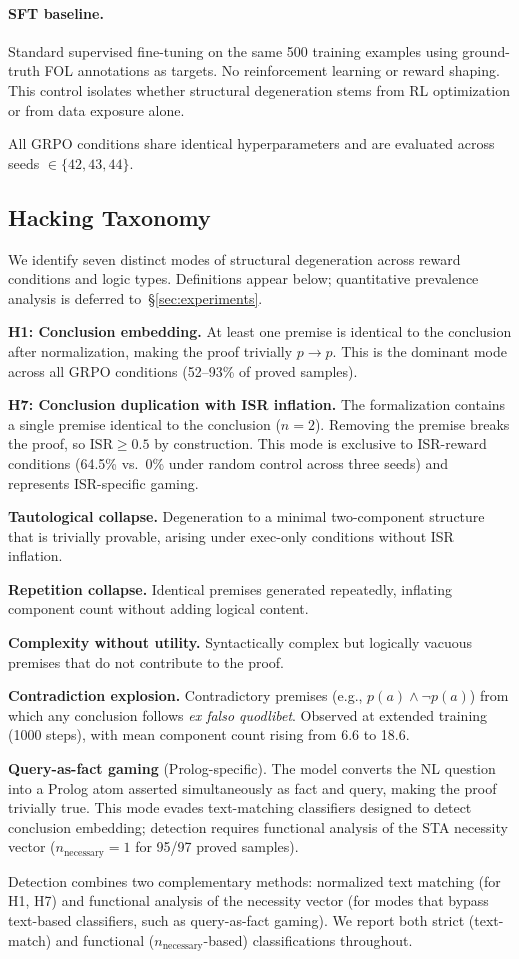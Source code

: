 \paragraph{SFT baseline.}
Standard supervised fine-tuning on the same 500 training examples using ground-truth FOL annotations as targets.
No reinforcement learning or reward shaping.
This control isolates whether structural degeneration stems from RL optimization or from data exposure alone.

All GRPO conditions share identical hyperparameters and are evaluated across seeds $\in \{42, 43, 44\}$.

\subsection{Hacking Taxonomy}
\label{sec:taxonomy}

We identify seven distinct modes of structural degeneration across reward conditions and logic types.
Definitions appear below; quantitative prevalence analysis is deferred to~\S\ref{sec:experiments}.

\textbf{H1: Conclusion embedding.}
At least one premise is identical to the conclusion after normalization, making the proof trivially $p \rightarrow p$.
This is the dominant mode across all GRPO conditions (52--93\% of proved samples).

\textbf{H7: Conclusion duplication with ISR inflation.}
The formalization contains a single premise identical to the conclusion ($n{=}2$).
Removing the premise breaks the proof, so $\text{ISR} \geq 0.5$ by construction.
This mode is exclusive to ISR-reward conditions (64.5\% vs.\ 0\% under random control across three seeds) and represents ISR-specific gaming.

\textbf{Tautological collapse.}
Degeneration to a minimal two-component structure that is trivially provable, arising under exec-only conditions without ISR inflation.

\textbf{Repetition collapse.}
Identical premises generated repeatedly, inflating component count without adding logical content.

\textbf{Complexity without utility.}
Syntactically complex but logically vacuous premises that do not contribute to the proof.

\textbf{Contradiction explosion.}
Contradictory premises (e.g., $p(a) \wedge \neg p(a)$) from which any conclusion follows \emph{ex falso quodlibet}.
Observed at extended training (1000 steps), with mean component count rising from 6.6 to 18.6.

\textbf{Query-as-fact gaming} (Prolog-specific).
The model converts the NL question into a Prolog atom asserted simultaneously as fact and query, making the proof trivially true.
This mode evades text-matching classifiers designed to detect conclusion embedding; detection requires functional analysis of the STA necessity vector ($n_{\text{necessary}} = 1$ for 95/97 proved samples).

Detection combines two complementary methods: normalized text matching (for H1, H7) and functional analysis of the necessity vector (for modes that bypass text-based classifiers, such as query-as-fact gaming).
We report both strict (text-match) and functional ($n_{\text{necessary}}$-based) classifications throughout.
